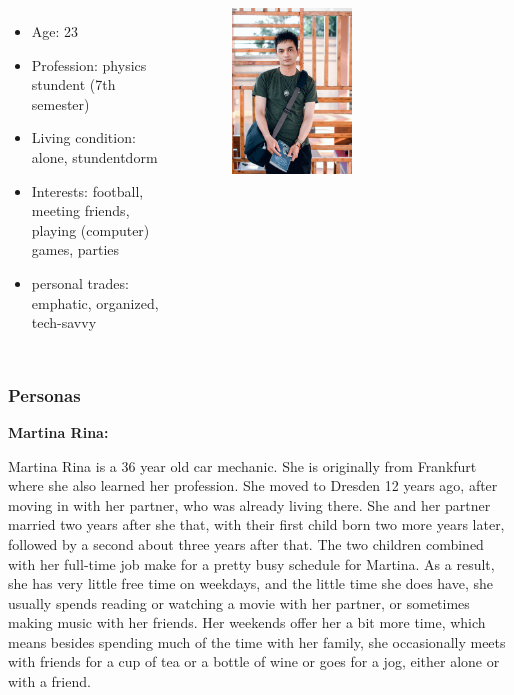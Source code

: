 \documentclass[aspectratio=169]{beamer}
\begin{document}
\begin{columns}
	\begin{itemize}
		\item Age: 23
		\item Profession: physics stundent (7th semester)
		\item Living condition: alone, stundentdorm
		\item Interests: football, meeting friends, playing (computer) games, parties
		\item personal trades: emphatic, organized, tech-savvy
	\end{itemize}
	 \begin{figure}
		 \centering
		\includegraphics[width=0.5\textwidth]{media/student.jpg}
	\end{figure}
\end{columns}





\begin{frame}   
	\frametitle{Personas}{\textbf{Martina Rina:}}

	Martina Rina is a 36 year old car mechanic. She is originally from Frankfurt where she also learned her profession. She moved to Dresden 12 years ago, after moving in with her partner, who was already living there. She and her partner married 	two years after she that, with their first child born two more years later, followed by a second about three years after that. The two children combined with her full-time job make for a pretty busy schedule for Martina. As a result, she has very little free time on weekdays, and the little time she does have, she usually spends reading or watching a movie with her partner, or sometimes making music with her friends. Her weekends offer her a bit more time, which means besides spending much of the time with her family, she occasionally meets with friends for a cup of tea or a bottle of wine or goes for a jog, either alone or with a friend. 

\end{frame}
\end{document}

